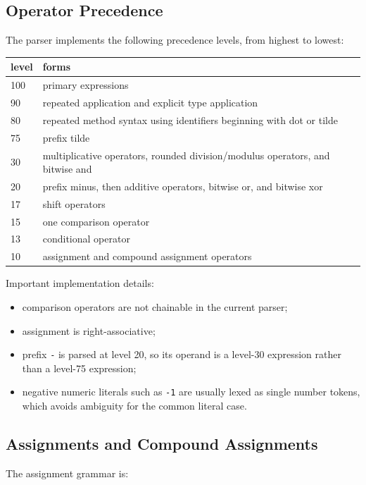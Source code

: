 \documentclass[12pt,oneside]{article}
\begin{document}
\subsection{Operator Precedence}
The parser implements the following precedence levels, from highest to lowest:

\begin{center}
\begin{tabular}{|l|m{}|}
\hline
level & forms \\ \hline
100 & primary expressions \\ \hline
90 & repeated application and explicit type application \\ \hline
80 & repeated method syntax using identifiers beginning with dot or tilde \\ \hline
75 & prefix tilde \\ \hline
30 & multiplicative operators, rounded division/modulus operators, and bitwise and \\ \hline
20 & prefix minus, then additive operators, bitwise or, and bitwise xor \\ \hline
17 & shift operators \\ \hline
15 & one comparison operator \\ \hline
13 & conditional operator \\ \hline
10 & assignment and compound assignment operators \\ \hline
\end{tabular}
\end{center}

Important implementation details:

\begin{itemize}
\item comparison operators are not chainable in the current parser;
\item assignment is right-associative;
\item prefix \verb|-| is parsed at level 20, so its operand is a level-30
expression rather than a level-75 expression;
\item negative numeric literals such as \verb|-1| are usually lexed as single
number tokens, which avoids ambiguity for the common literal case.
\end{itemize}

\subsection{Assignments and Compound Assignments}
The assignment grammar is:
\end{document}
